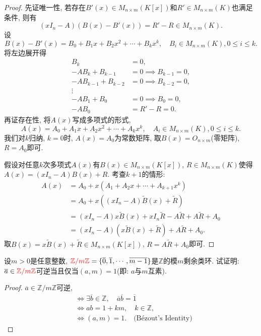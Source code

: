 \begin{proof}
    先证唯一性, 若存在$B'(x) \in M_{n \times m}(K[x])$和$R' \in M_{n \times m}(K)$也满足条件, 则有
    \[
        (xI_n - A)(B(x) - B'(x)) = R' - R \in M_{n \times m}(K).
    \]
    设
    \[
        B(x) - B'(x) = B_0 + B_1x + B_2x^2 + \cdots + B_kx^k, \quad B_i \in M_{n \times m}(K), 0 \leqslant i \leqslant k.
    \]
    将左边展开得
    \[
    \begin{aligned}
        B_k &= 0,\\
        -AB_k + B_{k - 1} &= 0 \implies B_{k - 1} = 0,\\
        -AB_{k - 1} + B_{k - 2} &= 0 \implies B_{k - 2} = 0,\\
        \vdots\\
        -AB_1 + B_0 &= 0 \implies B_0 = 0,\\
        -AB_0 &= R' - R = 0.
    \end{aligned}
    \]
    再证存在性, 将$A(x)$写成多项式的形式,
    \[
        A(x) = A_0 + A_1x + A_2x^2 + \cdots + A_kx^k, \quad A_i \in M_{n \times m}(K), 0 \leqslant i \leqslant k.
    \]
    我们对$k$归纳, $k = 0$时, $A(x) = A_0$为常数矩阵, 取$B(x) = O_{n \times m}$(零矩阵), $R = A_0$即可.
    
    假设对任意$k$次多项式$A(x)$有$B(x) \in M_{n \times m}(K[x])$, $R \in M_{n \times m}(K)$使得$A(x) = (xI_n - A)B(x) + R$. 考查$k + 1$的情形:
    \[
    \begin{aligned}
        A(x) &= A_0 + x(A_1 + A_2x + \cdots + A_{k + 1}x^k)\\
        &= A_0 + x((xI_n - A)\tilde{B}(x) + \tilde{R})\\
        &= (xI_n - A)x\tilde{B}(x) + xI_n\tilde{R} - A\tilde{R} + A\tilde{R}+ A_0\\
        &= (xI_n - A)(x\tilde{B}(x) + \tilde{R}) + A\tilde{R} + A_0.
    \end{aligned}
    \]
    取$B(x) = x\tilde{B}(x) + \tilde{R} \in M_{n \times m}(K[x])$, $R = A\tilde{R} + A_0$即可.
\end{proof}

\begin{problem}\label{ex:1.2.9}
    设$m > 0$是任意整数, $\textcolor{red}{\mathbb{Z}/m\mathbb{Z}} = \{\overline{0}, \overline{1}, \cdots, \overline{m-1}\}$是$\mathbb{Z}$的模$m$剩余类环. 试证明: $\overline{a} \in \textcolor{red}{\mathbb{Z}/m\mathbb{Z}}$可逆当且仅当$(a, m) = 1$(即: $a$与$m$互素).
\end{problem}

\begin{proof}
    $\overline{a} \in \mathbb{Z}/m\mathbb{Z}$可逆,
    \[
    \begin{aligned}
        &\iff \exists \overline{b} \in \mathbb{Z}, \quad \overline{a}\overline{b} = \overline{1}\\
        &\iff ab = 1 + km, \quad k \in \mathbb{Z},\\
        &\iff (a, m) = 1. \quad \text{(Bézout's Identity)}
    \end{aligned}
    \]
\end{proof}

